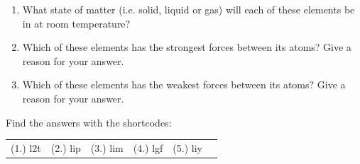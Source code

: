 \begin{enumerate}[noitemsep, label=\textbf{\arabic*}. ]
\begin{table}[H]
\begin{center}
\begin{xtabular}[t]{|l|l|l|}
    \end{xtabular}
      \end{center}
\end{table}
    \par
  \label{m38730*id312057}\begin{enumerate}[noitemsep, label=\textbf{\alph*}. ] 
            \label{m38730*uid109}\item What state of matter (i.e. solid, liquid or gas) will each of 
these elements be in at room temperature?
\label{m38730*uid110}\item Which of these elements has the strongest forces 
between its atoms? Give a reason for your answer.
\label{m38730*uid111}\item Which of these elements has the weakest forces between 
its atoms? Give a reason for your answer.
\end{enumerate}
                \end{enumerate}
\label{m38730**end}
  \label{3fc6acf7f608d0b0e2d136d6a7710402**end}
\par {} Find the answers with the shortcodes:
 \par \begin{tabular}[h]{cccccc}
 (1.) l2t  &  (2.) lip  &  (3.) lim  &  (4.) lgf  &  (5.) liy  & \end{tabular}
